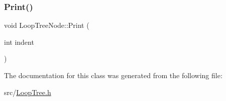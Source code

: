 \mbox{\label{classLoopTreeNode_a8a4e5bfb9d89feecd9d2312073b40d64}} 
\subsubsection{\texorpdfstring{Print()}{Print()}}
{\footnotesize\ttfamily void Loop\+Tree\+Node\+::\+Print (\begin{DoxyParamCaption}\item[{int}]{indent }\end{DoxyParamCaption})}



The documentation for this class was generated from the following file\+:\begin{DoxyCompactItemize}
\item 
src/\hyperlink{LoopTree_8h}{Loop\+Tree.\+h}\end{DoxyCompactItemize}
